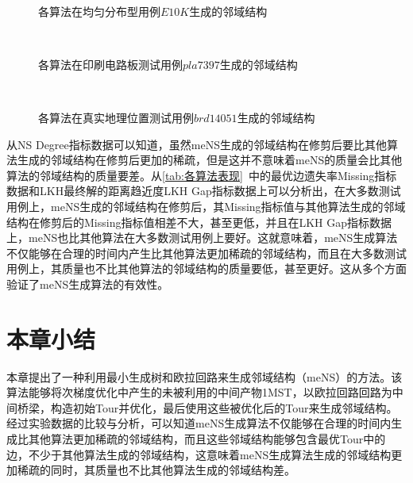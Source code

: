 \begin{figure}[!h]
     \\
    \caption[各算法在均匀分布型用例$E10K$生成的邻域结构]{各算法在均匀分布型用例$E10K$生成的邻域结构}
    \label{fig:各算法在均匀分布型用例E10K生成的邻域结构}
\end{figure}
\begin{figure}[!h]
     \\
    \caption[各算法在印刷电路板测试用例$pla7397$生成的邻域结构]{各算法在印刷电路板测试用例$pla7397$生成的邻域结构}
    \label{fig:各算法在印刷电路板测试用例pla7397生成的邻域结构}
\end{figure}
\begin{figure}[!h]
     \\
    \caption[各算法在真实地理位置测试用例$brd14051$生成的邻域结构]{各算法在真实地理位置测试用例$brd14051$生成的邻域结构}
    \label{fig:各算法在真实地理位置测试用例brd14051生成的邻域结构}
\end{figure}
\par
从NS Degree指标数据可以知道，虽然meNS生成的邻域结构在修剪后要比其他算法生成的邻域结构在修剪后更加的稀疏，但是这并不意味着meNS的质量会比其他算法的邻域结构的质量要差。从\autoref{tab:各算法表现}~中的最优边遗失率Missing指标数据和LKH最终解的距离趋近度LKH Gap指标数据上可以分析出，在大多数测试用例上，meNS生成的邻域结构在修剪后，其Missing指标值与其他算法生成的邻域结构在修剪后的Missing指标值相差不大，甚至更低，并且在LKH Gap指标数据上，meNS也比其他算法在大多数测试用例上要好。这就意味着，meNS生成算法不仅能够在合理的时间内产生比其他算法更加稀疏的邻域结构，而且在大多数测试用例上，其质量也不比其他算法的邻域结构的质量要低，甚至更好。这从多个方面验证了meNS生成算法的有效性。

\section{本章小结}
\label{sec:NS_Method:本章小结}
本章提出了一种利用最小生成树和欧拉回路来生成邻域结构（meNS）的方法。该算法能够将次梯度优化中产生的未被利用的中间产物1MST，以欧拉回路回路为中间桥梁，构造初始Tour并优化，最后使用这些被优化后的Tour来生成邻域结构。经过实验数据的比较与分析，可以知道meNS生成算法不仅能够在合理的时间内生成比其他算法更加稀疏的邻域结构，而且这些邻域结构能够包含最优Tour中的边，不少于其他算法生成的邻域结构，这意味着meNS生成算法生成的邻域结构更加稀疏的同时，其质量也不比其他算法生成的邻域结构差。
